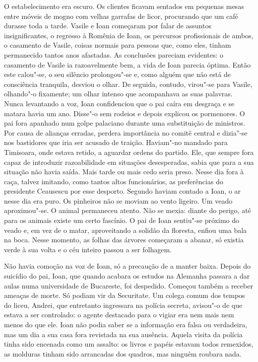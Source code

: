 O estabelecimento era escuro. Os clientes ficavam sentados em pequenas
mesas entre móveis de mogno com velhas garrafas de licor, procurando que
um café durasse toda a tarde. Vasile e Ioan começaram por falar de
assuntos insignificantes, o regresso à Romênia de Ioan, os percursos
profissionais de ambos, o casamento de Vasile, coisas normais para
pessoas que, como eles, tinham permanecido tantos anos afastadas. As
conclusões pareciam evidentes: o casamento de Vasile ia razoavelmente
bem, a vida de Ioan parecia óptima. Então este calou"-se, o seu silêncio
prolongou"-se e, como alguém que não está de consciência tranquila,
desviou o olhar. De seguida, contudo, virou"-se para Vasile, olhando"-o fixamente; um olhar intenso que
acompanhava as suas palavras. Nunca levantando a voz, Ioan
confidenciou que o pai caíra em desgraça e se matara havia um ano.
Disse"-o sem rodeios e depois explicou os pormenores. O pai fora apanhado
num golpe palaciano durante uma substituição de ministros. Por causa de
alianças erradas, perdera importância no comitê central e dizia"-se nos
bastidores que iria ser acusado de traição. Haviam"-no mandado para
Timisoara, onde estava retido, a aguardar ordens do partido. Ele, que
sempre fora capaz de introduzir razoabilidade em situações desesperadas, sabia que para a sua situação não havia saída. Mais tarde ou mais
cedo seria preso. Nesse dia fora à caça, talvez imitando, como tantos
altos funcionários, as preferências do presidente Ceausescu por esse
desporto. Segundo haviam contado a Ioan, o ar nesse dia era puro. Os
pinheiros não se moviam ao vento ligeiro. Um veado aproximou"-se. O animal permaneceu atento. Não se mexia: diante do
perigo, até para os animais existe um certo fascínio. O pai de Ioan
sentiu"-se próximo do veado e, em vez de o matar, aproveitando a solidão
da floresta, enfiou uma bala na boca. Nesse momento, as folhas das
árvores começaram a abanar, só existia verde à sua volta e o céu inteiro
passou a ser folhagem.

Não havia comoção na voz de Ioan, só a precaução de a manter baixa.
Depois do suicídio do pai, Ioan, que quando acabara os estudos na
Alemanha passara a dar aulas numa universidade de Bucareste, foi
despedido. Começou também a receber ameaças de morte. Só podiam vir da
Securitate. Um colega comum dos tempos do liceu,
Andrei, que entretanto ingressara na polícia secreta, avisou"-o de que
estava a ser controlado: o agente destacado para o vigiar era nem mais
nem menos do que ele. Ioan não podia saber se a informação era falsa ou
verdadeira, mas um dia a sua casa fora revistada na sua ausência. Aquela
visita da polícia tinha sido encenada como um assalto: os livros e
papéis estavam todos remexidos, as molduras tinham sido arrancadas dos
quadros, mas ninguém roubara nada.

